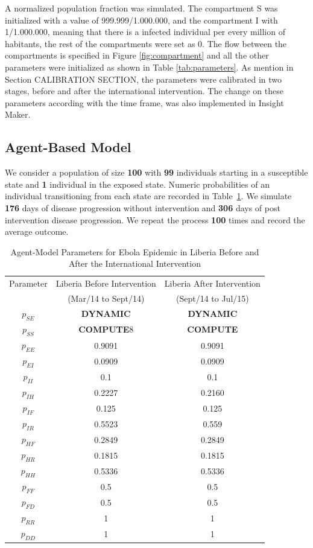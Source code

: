 \documentclass[10pt]{article}
\begin{document}
\noindent A normalized population fraction was simulated. The compartment S was initialized with a value of 999.999/1.000.000, and the compartment I with 1/1.000.000, meaning that there is a infected individual per every million of habitants, the rest of the compartments were set as 0. The flow between the compartments is specified in Figure \ref{fig:compartment} and all the other parameters were initialized as shown in Table \ref{tab:parameters}.  As mention in Section CALIBRATION SECTION, the parameters were calibrated in two stages, before and after the international intervention. The change on these parameters according with the time frame, was also implemented in Insight Maker.\\


\subsection{Agent-Based Model}
We consider a population of size \textbf{100} with \textbf{99} individuals starting in a susceptible state and \textbf{1} individual in the exposed state. Numeric probabilities of an individual transitioning from each state are recorded in Table~\ref{tab:probabilities}. We simulate \textbf{176} days of disease progression without intervention and \textbf{306} days of post intervention disease progression. We repeat the process \textbf{100} times and record the average outcome.  
%
%
%
%
%
%
\begin{table}[ht]
\caption{Agent-Model Parameters for Ebola Epidemic in Liberia Before and After the International Intervention} %
\centering %
\begin{tabular}{c c c } 
\hline\hline %
Parameter & Liberia Before Intervention  & Liberia After Intervention \\ [0.5ex] 
 & (Mar/14 to Sept/14) &  (Sept/14 to Jul/15) \\ [0.5ex] %
\hline %
$p_{SE}$ & \textbf{DYNAMIC} & \textbf{DYNAMIC} \\ 
$p_{SS}$ & \textbf{COMPUTE}8 & \textbf{COMPUTE}  \\ 
$p_{EE}$ & 0.9091 & 0.9091  \\ 
$p_{EI}$ & 0.0909 & 0.0909  \\ 
$p_{II}$ & 0.1 & 0.1  \\ 
$p_{IH}$ & 0.2227 & 0.2160  \\ 
$p_{IF}$ & 0.125 & 0.125  \\ 
$p_{IR}$ & 0.5523 & 0.559  \\ 
$p_{HF}$ & 0.2849 & 0.2849 \\ 
$p_{HR}$ & 0.1815 & 0.1815 \\ 
$p_{HH}$ & 0.5336& 0.5336  \\ 
$p_{FF}$ & 0.5 & 0.5 \\ 
$p_{FD}$ & 0.5 & 0.5  \\ 
$p_{RR}$ & 1 & 1  \\ 
$p_{DD}$ & 1 & 1 \\ [1ex] 
\hline 
\end{tabular}
\label{tab:probabilities}
\end{table}
\end{document}
